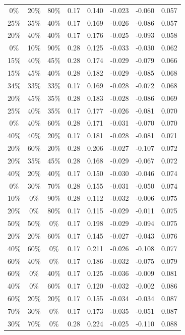 \documentclass{article}
\begin{document}
\begin{landscape}
\begin{longtable}{cccccccc}
0\% & 20\% & 80\% & 0.17 & 0.140 & -0.023 & -0.060 & 0.057 \\
25\% & 35\% & 40\% & 0.17 & 0.169 & -0.026 & -0.086 & 0.057 \\
20\% & 40\% & 40\% & 0.17 & 0.176 & -0.025 & -0.093 & 0.058 \\
0\% & 10\% & 90\% & 0.28 & 0.125 & -0.033 & -0.030 & 0.062 \\
15\% & 40\% & 45\% & 0.28 & 0.174 & -0.029 & -0.079 & 0.066 \\
15\% & 45\% & 40\% & 0.28 & 0.182 & -0.029 & -0.085 & 0.068 \\
34\% & 33\% & 33\% & 0.17 & 0.169 & -0.028 & -0.072 & 0.068 \\
20\% & 45\% & 35\% & 0.28 & 0.183 & -0.028 & -0.086 & 0.069 \\
25\% & 40\% & 35\% & 0.17 & 0.177 & -0.026 & -0.081 & 0.070 \\
0\% & 40\% & 60\% & 0.28 & 0.171 & -0.031 & -0.070 & 0.070 \\
40\% & 40\% & 20\% & 0.17 & 0.181 & -0.028 & -0.081 & 0.071 \\
20\% & 60\% & 20\% & 0.28 & 0.206 & -0.027 & -0.107 & 0.072 \\
20\% & 35\% & 45\% & 0.28 & 0.168 & -0.029 & -0.067 & 0.072 \\
40\% & 20\% & 40\% & 0.17 & 0.150 & -0.030 & -0.046 & 0.074 \\
0\% & 30\% & 70\% & 0.28 & 0.155 & -0.031 & -0.050 & 0.074 \\
10\% & 0\% & 90\% & 0.28 & 0.112 & -0.032 & -0.006 & 0.075 \\
20\% & 0\% & 80\% & 0.17 & 0.115 & -0.029 & -0.011 & 0.075 \\
50\% & 50\% & 0\% & 0.17 & 0.198 & -0.029 & -0.094 & 0.075 \\
20\% & 20\% & 60\% & 0.17 & 0.145 & -0.027 & -0.043 & 0.076 \\
40\% & 60\% & 0\% & 0.17 & 0.211 & -0.026 & -0.108 & 0.077 \\
60\% & 40\% & 0\% & 0.17 & 0.186 & -0.032 & -0.075 & 0.079 \\
60\% & 0\% & 40\% & 0.17 & 0.125 & -0.036 & -0.009 & 0.081 \\
40\% & 0\% & 60\% & 0.17 & 0.120 & -0.032 & -0.002 & 0.086 \\
60\% & 20\% & 20\% & 0.17 & 0.155 & -0.034 & -0.034 & 0.087 \\
70\% & 30\% & 0\% & 0.17 & 0.173 & -0.035 & -0.051 & 0.087 \\
30\% & 70\% & 0\% & 0.28 & 0.224 & -0.025 & -0.110 & 0.088 \\

\end{longtable}
\end{landscape}
\end{document}
